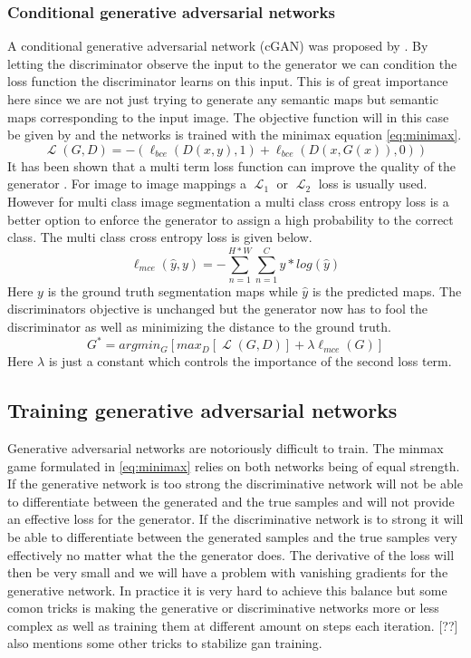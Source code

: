 \documentclass[a4paper,11pt]{article}
\DeclareMathOperator{\Lagr}{\mathcal{L}}
\begin{document}
\subsubsection{Conditional generative adversarial networks}
A conditional generative adversarial network (cGAN) was proposed by \cite{mirza_conditional_2014}.
By letting the discriminator observe the input to the generator we can condition the loss function the discriminator learns on this input. This is of great importance here since we are not just trying to generate any semantic maps but semantic maps corresponding to the input image. The objective function will in this case be given by and the networks is trained with the minimax equation \eqref{eq:minimax}.
\begin{equation}
\Lagr(G, D) =  -(\ell_{bce}(D(x, y), 1) + \ell_{bce}(D(x, G(x)), 0))
\end{equation}
It has been shown that a multi term loss function can improve the quality of the generator \cite{pathak_context_2016, isola_image--image_2016}. For image to image mappings a $\Lagr_1$ or $\Lagr_2$ loss is usually used. However for multi class image segmentation a multi class cross entropy loss is a better option to enforce the generator to assign a high probability to the correct class. The multi class cross entropy loss is given below.
\begin{equation}\label{eq:mce}
\ell_{mce}(\hat{y}, y) = - \sum_{n=1}^{H*W} \sum_{n=1}^{C}y*log(\hat{y})
\end{equation}
Here $y$ is the ground truth segmentation maps while $\hat{y}$ is the predicted maps. The discriminators objective is unchanged but the generator now has to fool the discriminator as well as minimizing the distance to the ground truth.
\begin{equation}
G^{*}=argmin_{G}[max_{D}[\Lagr(G, D)] + \lambda \ell_{mce}(G)]
\end{equation}
Here $\lambda$ is just a constant which controls the importance of the second  loss term.
\subsection{Training generative adversarial networks}
Generative adversarial networks are notoriously difficult to train. The minmax game formulated in \ref{eq:minimax} relies on both networks being of equal strength. If the generative network is too strong the discriminative network will not be able to differentiate between the generated and the true samples and will not provide an effective loss for the generator. If the discriminative network is to strong it will be able to differentiate between the generated samples and the true samples very effectively no matter what the the generator does. The derivative of the loss will then be very small and we will have a problem with vanishing gradients for the generative network. In practice it is very hard to achieve this balance but some comon tricks is making the generative or discriminative networks more or less complex as well as training them at different amount on steps each iteration. [??] also mentions some other tricks to stabilize gan training.
\end{document}
